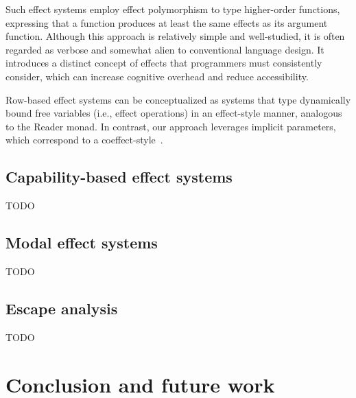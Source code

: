 \documentclass[acmsmall,review,screen]{acmart}
\begin{document}
Such effect systems employ effect polymorphism to type higher-order functions, expressing that a function produces at least the same effects as its argument function.
Although this approach is relatively simple and well-studied, it is often regarded as verbose and somewhat alien to conventional language design.
It introduces a distinct concept of effects that programmers must consistently consider, which can increase cognitive overhead and reduce accessibility.

Row-based effect systems can be conceptualized as systems that type dynamically bound free variables (i.e., effect operations) in an effect-style manner, analogous to the Reader monad.
In contrast, our approach leverages implicit parameters, which correspond to a coeffect-style~\cite{petricek2014coeffects}. %

\subsection{Capability-based effect systems} \label{subsec:overview-caps}



TODO %

\subsection{Modal effect systems} \label{subsec:overview-modal}

TODO %

\subsection{Escape analysis} \label{subsec:overview-escape-analysis}

TODO %





\section{Conclusion and future work} \label{sec:conclusion}

\end{document}
